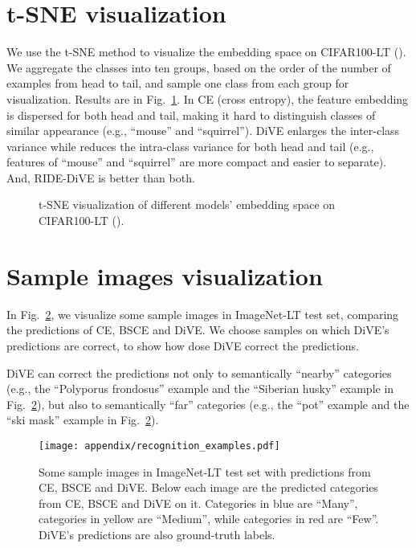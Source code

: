 \documentclass[10pt,twocolumn,letterpaper]{article}
\begin{document}
\section{t-SNE visualization}

We use the t-SNE method to visualize the embedding space on CIFAR100-LT (). We aggregate the classes into ten groups, based on the order of the number of examples from head to tail, and sample one class from each group for visualization. Results are in Fig.~\ref{fig.tsne}. In CE (cross entropy), the feature embedding is dispersed for both head and tail, making it hard to distinguish classes of similar appearance (e.g., ``mouse'' and ``squirrel''). DiVE enlarges the inter-class variance while reduces the intra-class variance for both head and tail (e.g., features of ``mouse'' and ``squirrel'' are more compact and easier to separate). And, RIDE-DiVE is better than both.
\begin{figure}
    \centering
    \quad
    \quad
    \caption{t-SNE visualization of different models' embedding space on CIFAR100-LT ().}
    \label{fig.tsne}
\end{figure}

\section{Sample images visualization}

In Fig.~\ref{fig:recognitin_examples}, we visualize some sample images in ImageNet-LT test set, comparing the predictions of CE, BSCE and DiVE. We choose samples on which DiVE's predictions are correct, to show how dose DiVE correct the predictions.

DiVE can correct the predictions not only to semantically ``nearby'' categories (e.g., the ``Polyporus frondosus'' example and the ``Siberian husky'' example in Fig.~\ref{fig:recognitin_examples}), but also to semantically ``far'' categories (e.g., the ``pot'' example and the ``ski mask'' example in Fig.~\ref{fig:recognitin_examples}).

\begin{figure}
    \centering
    \texttt{[image: appendix/recognition\_examples.pdf]}
    \caption{Some sample images in ImageNet-LT test set with predictions from CE, BSCE and DiVE. Below each image are the predicted categories from CE, BSCE and DiVE on it. Categories in blue are ``Many'', categories in yellow are ``Medium'', while categories in red are ``Few''. DiVE's predictions are also ground-truth labels.}
    \label{fig:recognitin_examples}
 \end{figure}
\end{document}
